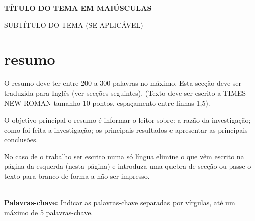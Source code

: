 \begingroup
\begin{flushleft}
\bfseries
{}
{\Large
	TÍTULO DO TEMA EM MAIÚSCULAS}

\mdseries		%
{\Large SUBTÍTULO DO TEMA (SE APLICÁVEL)}
\end{flushleft}
\normalsize
\let\clearpage\relax

\chapter{resumo}
\endgroup

O resumo deve ter entre 200 a 300 palavras no máximo. Esta secção deve ser traduzida para Inglês (ver secções seguintes).  (Texto deve ser escrito a TIMES NEW ROMAN tamanho 10 pontos, espaçamento entre linhas 1,5).

O objetivo principal o resumo é informar o leitor sobre: a razão da investigação; como foi feita a investigação; os principais resultados e apresentar as principais conclusões.
 
No caso de o trabalho ser escrito numa só língua elimine o que vêm escrito na página da esquerda (nesta página) e introduza uma quebra de secção ou passe o texto para branco de forma a não ser impresso.






\hspace{3cm}\\		%
\indent				%
 \textbf{Palavras-chave: } Indicar as palavras-chave separadas por vírgulas, até um máximo de 5 palavras-chave.
